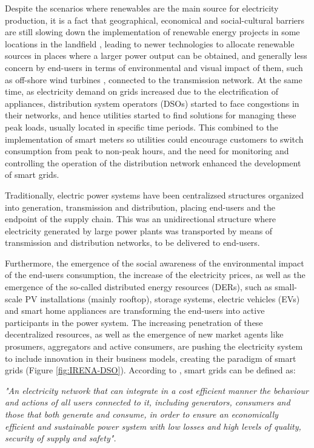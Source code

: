 Despite the scenarios where renewables are the main source for electricity production, it is a fact that geographical, economical and social-cultural barriers are still slowing down the implementation of renewable energy projects in some locations in the landfield \cite{ASANTE2020111479, barriers2020}, leading to newer technologies to allocate renewable sources in places where a larger power output can be obtained, and generally less concern by end-users in terms of environmental and visual impact of them, such as off-shore wind turbines \cite{Kaldellis2016, KPMG2019}, connected to the transmission network. At the same time, as electricity demand on grids increased due to the electrification of appliances, distribution system operators (DSOs) started to face congestions in their networks, and hence utilities started to find solutions for managing these peak loads, usually located in specific time periods.  This combined to the implementation of smart meters so utilities could encourage customers to switch consumption from peak to non-peak hours, and the need for monitoring and controlling the operation of the distribution network enhanced the development of smart grids.

Traditionally, electric power systems have been centralizsed structures organized into generation, transmission and distribution, placing end-users and the endpoint of the supply chain. This was an unidirectional structure where electricity generated by large power plants was transported by means of transmission and distribution networks, to be delivered to end-users. 

Furthermore, the emergence of the social awareness of the environmental impact of the end-users consumption, the increase of the electricity prices, as well as the emergence of the so-called distributed energy resources (DERs), such as small-scale PV installations (mainly rooftop), storage systems, electric vehicles (EVs) and smart home appliances are transforming the end-users into active participants in the power system. The increasing penetration of these decentralized resources, as well as the emergence of new market agents like prosumers, aggregators and active consumers, are pushing the electricity system to include innovation in their business models, creating the paradigm of smart grids (Figure \ref{fig:IRENA-DSO}). According to \cite{EuropeanParliamentSG}, smart grids can be defined as:
\vspace*{3mm}
\begin{tcolorbox}
\textit{"An electricity network that can integrate in a cost efficient manner the behaviour and actions of all users connected to it, including generators, consumers and those that both generate and consume, in order to ensure an economically efficient and sustainable power system with low losses and high levels of quality, security of supply and safety".} 
\end{tcolorbox}
\vspace*{5mm}

